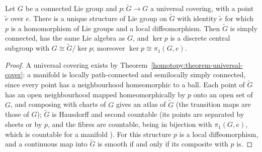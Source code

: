 \begin{theorem}\label{lie-groups:theorem-universal-covering-group}
Let $G$ be a connected Lie group and $p \colon \widetilde{G} \to G$ a universal covering, with a point $\widetilde{e}$ over $e$. There is a unique structure of Lie group on
$\widetilde{G}$ with identity $\widetilde{e}$ for which $p$ is a homomorphism of Lie groups and a local diffeomorphism. Then $\widetilde{G}$ is simply connected, has the
same Lie algebra as $G$, and $\ker p$ is a discrete central subgroup with $G \cong \widetilde{G}/\ker p$; moreover $\ker p \cong \pi_1(G, e)$.
\end{theorem}

\begin{proof}
A universal covering exists by Theorem~\ref{homotopy:theorem-universal-cover}: a manifold is locally path-connected and semilocally simply connected, since every
point has a neighbourhood homeomorphic to a ball. Each point of $\widetilde{G}$ has an open neighbourhood mapped homeomorphically by $p$ onto an open set of $G$, and
composing with charts of $G$ gives an atlas of $\widetilde{G}$ (the transition maps are those of $G$); $\widetilde{G}$ is Hausdorff and second countable (its points are
separated by sheets or by $p$, and the fibres are countable, being in bijection with $\pi_1(G, e)$, which is countable for a manifold
\cite[Chapter 1]{lee-smooth-manifolds}). For this structure $p$ is a
local diffeomorphism, and a continuous map into $\widetilde{G}$ is smooth if and only if its composite with $p$ is.


\end{proof}
